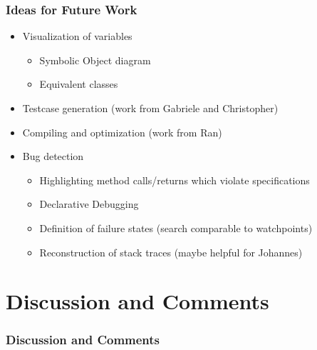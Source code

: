\documentclass[accentcolor=tud9d,colorbacktitle,inverttitle,landscape,english,presentation,t]{tudbeamer}
\begin{document}
   \begin{frame}[t]
		\frametitle{Ideas for Future Work}
      
      \begin{itemize}
         \item Visualization of variables
               \begin{itemize}
                  \item Symbolic Object diagram
                  \item Equivalent classes
               \end{itemize}
         \item Testcase generation (work from Gabriele and Christopher)
         \item Compiling and optimization (work from Ran)
         \item Bug detection
               \begin{itemize}
                  \item Highlighting method calls/returns which violate specifications
                  \item Declarative Debugging
                  \item Definition of failure states (search comparable to watchpoints)
                  \item Reconstruction of stack traces (maybe helpful for Johannes)
               \end{itemize}
      \end{itemize}
	\end{frame}
   
\section{Discussion and Comments}
   
   \begin{frame}[t]
		\frametitle{Discussion and Comments}
	\end{frame}
\end{document}
